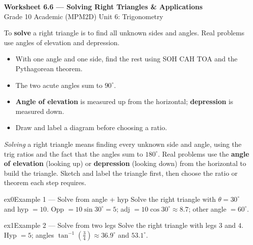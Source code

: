 \documentclass[11pt]{article}
\begin{document}
\begin{center}
{\LARGE\bfseries\color{titleblue}Worksheet 6.6 --- Solving Right Triangles \& Applications}\\[2pt]
{\small Grade 10 Academic (MPM2D) \textperiodcentered{} Unit 6: Trigonometry}
\end{center}

\begin{ideabox}
To \textbf{solve} a right triangle is to find all unknown sides and angles. Real problems use angles of elevation and depression.
\begin{itemize}[leftmargin=*,itemsep=2pt]
  \item With one angle and one side, find the rest using SOH CAH TOA and the Pythagorean theorem.
  \item The two acute angles sum to $90^\circ$.
  \item \textbf{Angle of elevation} is measured up from the horizontal; \textbf{depression} is measured down.
  \item Draw and label a diagram before choosing a ratio.
\end{itemize}
\end{ideabox}

\begin{learnbox}
\emph{Solving} a right triangle means finding every unknown side and angle, using the trig ratios and the fact that the angles sum to $180^\circ$.
Real problems use the \textbf{angle of elevation} (looking up) or \textbf{depression} (looking down) from the horizontal to build the triangle.
Sketch and label the triangle first, then choose the ratio or theorem each step requires.
\end{learnbox}


\begin{example}{ex0}{Example 1 --- Solve from angle + hyp}
Solve the right triangle with $\theta=30^\circ$ and hyp $=10$.
\soln Opp $=10\sin30^\circ=5$; adj $=10\cos30^\circ\approx8.7$; other angle $=60^\circ.$
\end{example}

\begin{example}{ex1}{Example 2 --- Solve from two legs}
Solve the right triangle with legs $3$ and $4$.
\soln Hyp $=5$; angles $\tan^{-1}(\tfrac34)\approx36.9^\circ$ and $53.1^\circ.$
\end{example}
\end{document}
